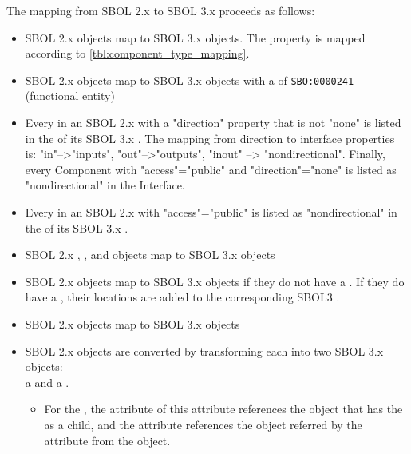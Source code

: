 The mapping from SBOL 2.x to SBOL 3.x proceeds as follows:
\begin{itemize}
    \item SBOL 2.x  objects map to SBOL 3.x  objects.  The  property is mapped according to  \ref{tbl:component_type_mapping}.
    \item SBOL 2.x  objects map to SBOL 3.x  objects with a  of \texttt{SBO:0000241} (functional entity)
    \item Every  in an SBOL 2.x  with a "direction" property that is not "none" is listed in the  of its SBOL 3.x . The mapping from direction to interface properties is: "in"-->"inputs", "out"-->"outputs", "inout" --> "nondirectional". Finally, every Component with "access"="public" and "direction"="none" is listed as "nondirectional" in the Interface.
    \item Every  in an SBOL 2.x  with "access"="public" is listed as "nondirectional" in the  of its SBOL 3.x .
    \item SBOL 2.x , , and  objects map to SBOL 3.x  objects
    \item SBOL 2.x  objects map to SBOL 3.x  objects if they do not have a . If they do have a , their locations are added to the corresponding SBOL3 .
    \item SBOL 2.x  objects map to SBOL 3.x  objects
    \item SBOL 2.x  objects are converted by transforming each  into two SBOL 3.x objects: \\ a  and a .
      \begin{itemize}
      \item For the , the  attribute of this  attribute references the object that has the  as a child, and the  attribute references the object referred by the  attribute from the  object.

\end{itemize}
\end{itemize}
